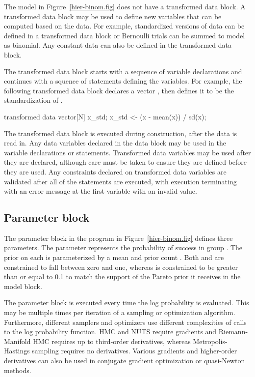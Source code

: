 \documentclass[article]{jss}
\begin{document}
The model in Figure~\ref{hier-binom.fig} does not have a transformed
data block.  A transformed data block may be used to define new
variables that can be computed based on the data.  For example,
standardized versions of data can be defined in a transformed
data block or Bernoulli trials can be summed to model as binomial.
Any constant data can also be defined in the transformed data block.

The transformed data block starts with a sequence of variable
declarations and continues with a squence of statements defining the
variables.  For example, the following transformed data block declares
a vector , then defines it to be the standardization of .
%
\begin{Code}
transformed data {
  vector[N] x_std;
  x_std <- (x - mean(x)) / sd(x);
}
\end{Code}

The transformed data block is executed during construction, after the
data is read in.  Any data variables declared in the data block may be
used in the variable declarations or statements.  Transformed data
variables may be used after they are declared, although care must be
taken to ensure they are defined before they are used.  Any
constraints declared on transformed data variables are validated after
all of the statements are executed, with execution terminating with an
error message at the first variable with an invalid value.

\subsection{Parameter block}

The parameter block in the program in Figure~\ref{hier-binom.fig}
defines three parameters.  The parameter  represents
the probability of success in group .  The prior on each
 is parameterized by a mean  and prior
count .  Both  and  are
constrained to fall between zero and one, whereas  is
constrained to be greater than or equal to 0.1 to match the support of
the Pareto prior it receives in the model block.

The parameter block is executed every time the log probability is
evaluated.  This may be multiple times per iteration of a sampling or
optimization algorithm.  Furthermore, different samplers and
optimizers use different complexities of calls to the log probability
function.  HMC and NUTS require gradients and Riemann-Manifold HMC
requires up to third-order derivatives, whereas Metropolis-Hastings
sampling requires no derivatives.  Various gradients and higher-order
derivatives can also be used in conjugate gradient optimization or
quasi-Newton methods.
\end{document}
